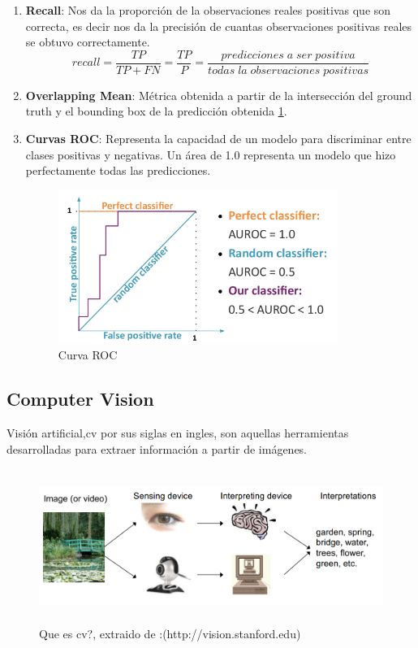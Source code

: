 \begin{enumerate}
\item \textbf{Recall}: Nos da la proporción de la observaciones reales positivas que son correcta, es decir nos da la precisión de cuantas observaciones positivas reales se obtuvo correctamente.
\begin{equation}
recall = \frac{TP}{TP+FN} = \frac{TP}{P} = \frac{predicciones\;a\;ser\;positiva}{todas\;la\;observaciones\;positivas} 
\end{equation}

\item \textbf{Overlapping Mean}: Métrica obtenida a partir de la intersección del ground truth y el bounding box de la predicción obtenida \ref{Fig: roc}.

\item \textbf{Curvas ROC}: Representa la capacidad de un modelo para discriminar entre clases positivas y negativas. Un área de 1.0 representa un modelo que hizo perfectamente todas las predicciones.
\begin{figure}[H]
 \centering
  \includegraphics[height=5cm,keepaspectratio=true,clip=true]{imagenes/MarcoTeorico/curvas-roc.png}
  \caption{Curva ROC}
	\label{Fig: roc}
\end{figure}


\end{enumerate}


\subsection{Computer Vision}\label{sub:compueter-vision}
Visión artificial,\ac{cv} por sus siglas en ingles, son aquellas herramientas desarrolladas para extraer información a partir de imágenes.
\begin{figure}[H]
 \centering
  \includegraphics[height=5cm,keepaspectratio=true,clip=true]{imagenes/MarcoTeorico/computer-vision.png}
  \caption{Que es \ac{cv}?, extraido de :(http://vision.stanford.edu)}
	\label{Fig: computer-vision}
\end{figure}


